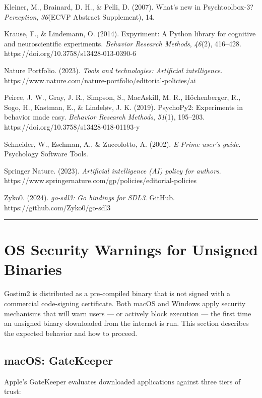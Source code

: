 \documentclass[
  11pt,
]{article}
\begin{document}
Kleiner, M., Brainard, D. H., \& Pelli, D. (2007). What's new in
Psychtoolbox-3? \emph{Perception}, \emph{36}(ECVP Abstract Supplement),
14.

Krause, F., \& Lindemann, O. (2014). Expyriment: A Python library for
cognitive and neuroscientific experiments. \emph{Behavior Research
Methods}, \emph{46}(2), 416--428.
https://doi.org/10.3758/s13428-013-0390-6

Nature Portfolio. (2023). \emph{Tools and technologies: Artificial
intelligence}.
https://www.nature.com/nature-portfolio/editorial-policies/ai

Peirce, J. W., Gray, J. R., Simpson, S., MacAskill, M. R., Höchenberger,
R., Sogo, H., Kastman, E., \& Lindeløv, J. K. (2019). PsychoPy2:
Experiments in behavior made easy. \emph{Behavior Research Methods},
\emph{51}(1), 195--203. https://doi.org/10.3758/s13428-018-01193-y

Schneider, W., Eschman, A., \& Zuccolotto, A. (2002). \emph{E-Prime
user's guide}. Psychology Software Tools.

Springer Nature. (2023). \emph{Artificial intelligence (AI) policy for
authors}. https://www.springernature.com/gp/policies/editorial-policies

Zyko0. (2024). \emph{go-sdl3: Go bindings for SDL3}. GitHub.
https://github.com/Zyko0/go-sdl3

\begin{center}\rule{0.5\linewidth}{0.5pt}\end{center}

\appendix
\section{OS Security Warnings for Unsigned
Binaries}\label{appendix-os-security-warnings-for-unsigned-binaries}

Gostim2 is distributed as a pre-compiled binary that is not signed with
a commercial code-signing certificate. Both macOS and Windows apply
security mechanisms that will warn users --- or actively block execution
--- the first time an unsigned binary downloaded from the internet is
run. This section describes the expected behavior and how to proceed.

\subsection{macOS: GateKeeper}\label{macos-gatekeeper}

Apple's GateKeeper evaluates downloaded applications against three tiers
of trust:
\end{document}

